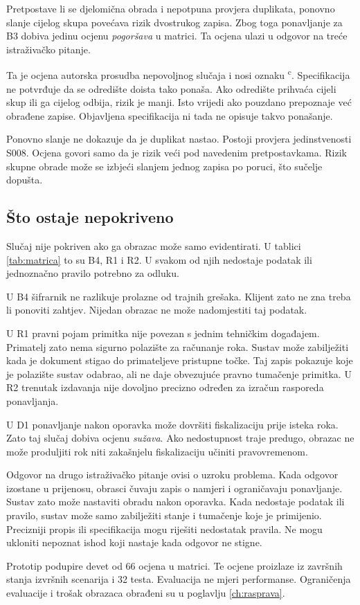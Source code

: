 Pretpostave li se djelomična obrada i nepotpuna provjera duplikata, ponovno
slanje cijelog skupa povećava rizik dvostrukog zapisa. Zbog toga ponavljanje
za B3 dobiva jedinu ocjenu \emph{pogoršava} u matrici. Ta ocjena ulazi u
odgovor na treće istraživačko pitanje.

Ta je ocjena autorska prosudba nepovoljnog slučaja i nosi oznaku
\textsuperscript{c}. Specifikacija ne potvrđuje da se odredište doista tako
ponaša. Ako odredište prihvaća cijeli skup ili ga cijelog odbija, rizik je
manji. Isto vrijedi ako pouzdano prepoznaje već obrađene zapise. Objavljena
specifikacija ni tada ne opisuje takvo ponašanje.

Ponovno slanje ne dokazuje da je duplikat nastao. Postoji provjera
jedinstvenosti S008. Ocjena govori samo da je rizik veći pod navedenim
pretpostavkama. Rizik skupne obrade može se izbjeći slanjem jednog zapisa po
poruci, što sučelje dopušta.

\subsection{Što ostaje nepokriveno}
\label{sec:nepokriveno}

Slučaj nije pokriven ako ga obrazac može samo evidentirati. U tablici
\ref{tab:matrica} to su B4, R1 i R2. U svakom od njih nedostaje podatak ili
jednoznačno pravilo potrebno za odluku.

U B4 šifrarnik ne razlikuje prolazne od trajnih grešaka. Klijent zato ne zna
treba li ponoviti zahtjev. Nijedan obrazac ne može nadomjestiti taj podatak.

U R1 pravni pojam primitka nije povezan s jednim tehničkim događajem.
Primatelj zato nema sigurno polazište za računanje roka. Sustav može
zabilježiti kada je dokument stigao do primateljeve pristupne točke. Taj
zapis pokazuje koje je polazište sustav odabrao, ali ne daje obvezujuće
pravno tumačenje primitka. U R2 trenutak izdavanja nije dovoljno precizno
određen za izračun rasporeda ponavljanja.

U D1 ponavljanje nakon oporavka može dovršiti fiskalizaciju prije isteka
roka. Zato taj slučaj dobiva ocjenu \emph{sužava}. Ako nedostupnost traje
predugo, obrazac ne može produljiti rok niti zakašnjelu fiskalizaciju
učiniti pravovremenom.

Odgovor na drugo istraživačko pitanje ovisi o uzroku problema. Kada odgovor
izostane u prijenosu, obrasci čuvaju zapis o namjeri i ograničavaju
ponavljanje. Sustav zato može nastaviti obradu nakon oporavka. Kada nedostaje
podatak ili pravilo, sustav može samo zabilježiti stanje i tumačenje koje je
primijenio. Precizniji propis ili specifikacija mogu riješiti nedostatak
pravila. Ne mogu ukloniti nepoznat ishod koji nastaje kada odgovor ne stigne.

Prototip podupire devet od 66 ocjena u matrici. Te ocjene proizlaze iz
završnih stanja izvršnih scenarija i 32 testa. Evaluacija ne mjeri
performanse. Ograničenja evaluacije i trošak obrazaca obrađeni su u poglavlju
\ref{ch:rasprava}.
